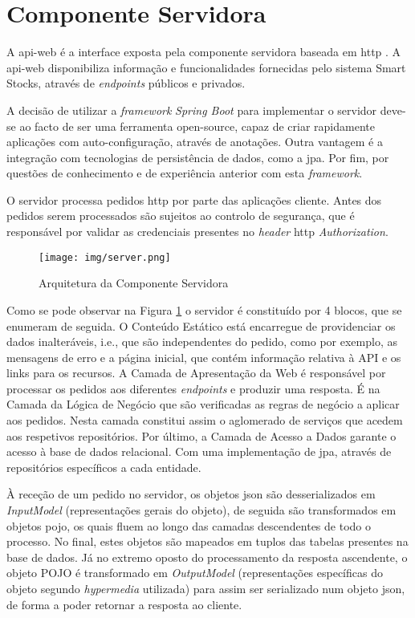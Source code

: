 \section{Componente Servidora}\label{sec33}

A \gls{api-web} é a interface exposta pela componente servidora baseada em \acrshort{http} \cite{RFC7231:http}. A \gls{api-web} disponibiliza informação e funcionalidades fornecidas pelo sistema Smart Stocks, através de \textit{endpoints} públicos e privados.

A decisão de utilizar a \textit{framework} \textit{Spring Boot} para implementar o servidor deve-se ao facto de ser uma ferramenta \gls{open-source}, capaz de criar rapidamente aplicações com auto-configuração, através de anotações. Outra vantagem é a integração com tecnologias de persistência de dados, como a \acrfull{jpa}. Por fim, por questões de conhecimento e de experiência anterior com esta \textit{framework}.

O servidor processa pedidos \acrshort{http} por parte das aplicações cliente. Antes dos pedidos serem processados são sujeitos ao controlo de segurança, que é responsável por validar as credenciais presentes no  \textit{header} \acrshort{http} \textit{Authorization}. 

\begin{figure}[H]
    \hspace*{-1,3cm}
	\centering
	\texttt{[image: img/server.png]}
	\caption{Arquitetura da Componente Servidora}
	\label{server-architecture}
\end{figure}

Como se pode observar na Figura \ref{server-architecture} o servidor é constituído por 4 blocos, que se enumeram de seguida. O Conteúdo Estático está encarregue de providenciar os dados inalteráveis, i.e., que são independentes do pedido, como por exemplo, as mensagens de erro e a página inicial, que contém informação relativa à API e os links para os recursos. A Camada de Apresentação da Web é responsável por processar os pedidos aos diferentes \textit{endpoints} e produzir uma resposta. É na Camada da Lógica de Negócio que são verificadas as regras de negócio a aplicar aos pedidos. Nesta camada constitui assim o aglomerado de serviços que acedem aos respetivos repositórios. Por último, a Camada de Acesso a Dados garante o acesso à base de dados relacional. Com uma implementação de \acrshort{jpa}, através de repositórios específicos a cada entidade.

À receção de um pedido no servidor, os objetos \acrfull{json} são desserializados em \textit{InputModel} (representações gerais do objeto), de seguida são transformados em objetos \acrfull{pojo}, os quais fluem ao longo das camadas descendentes de todo o processo. No final, estes objetos são mapeados em tuplos das tabelas presentes na base de dados. Já no extremo oposto do processamento da resposta ascendente, o objeto POJO é transformado em \textit{OutputModel} (representações específicas do objeto segundo \textit{hypermedia} utilizada) para assim ser serializado num objeto \acrshort{json}, de forma a poder retornar a resposta ao cliente.


